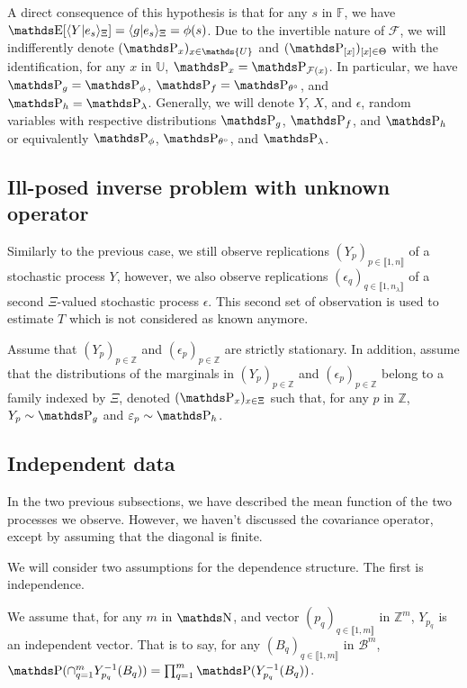 A direct consequence of this hypothesis is that for any $s$ in $\mathds{F}$, we have $\E[ \langle Y \vert e_{s} \rangle_{\Xi}] = \langle g \vert e_{s}\rangle_{\Xi}  = \phi(s)$.
Due to the invertible nature of $\mathcal{F}$, we will indifferently denote $(\P_{x})_{x \in \mathds{U}}$ and $(\P_{[x]})_{[x] \in \Theta}$ with the identification, for any $x$ in $\mathds{U}$, $\P_{x} = \P_{\mathcal{F}(x)}$.
In particular, we have $\P_{g} = \P_{\phi}$, $\P_{f} = \P_{\theta^{\circ}}$, and $\P_{h} = \P_{\lambda}$.
Generally, we will denote $Y$, $X$, and $\epsilon$, random variables with respective distributions $\P_{g}$, $\P_{f}$, and $\P_{h}$ or equivalently $\P_{\phi}$, $\P_{\theta^{\circ}}$, and $\P_{\lambda}$.

\subsection{Ill-posed inverse problem with unknown operator}\label{INTRO_DATA_UNKNOWN}
Similarly to the previous case, we still observe replications $(Y_{p})_{p \in \llbracket 1, n \rrbracket}$ of a stochastic process $Y$, however, we also observe replications $(\epsilon_{q})_{q \in \llbracket 1, n_{\lambda} \rrbracket}$ of a second $\Xi$-valued stochastic process $\epsilon$.
This second set of observation is used to estimate $T$ which is not considered as known anymore.
\begin{as}\label{AS_INTRO_DATA_UNKNOWN}
Assume that $(Y_{p})_{p \in \mathds{Z}}$ and $(\epsilon_{p})_{p \in \mathds{Z}}$ are strictly stationary.
In addition, assume that the distributions of the marginals in $(Y_{p})_{p \in \mathds{Z}}$ and $(\epsilon_{p})_{p \in \mathds{Z}}$ belong to a family indexed by $\Xi$, denoted $(\P_{x})_{x \in \Xi}$ such that, for any $p$ in $\mathds{Z}$, $Y_{p} \sim \P_{g}$ and $\epsilon_{p} \sim \P_{h}$.
\assEnd
\end{as}

\subsection{Independent data}\label{INTRO_DATA_INDEPENDENT}
In the two previous subsections, we have described the mean function of the two processes we observe.
However, we haven't discussed the covariance operator, except by assuming that the diagonal is finite.

We will consider two assumptions for the dependence structure.
The first is independence.

\begin{as}\label{AS_INTRO_DATA_INDEPENDENT}
We assume that, for any $m$ in $\N$, and vector $(p_{q})_{q \in \llbracket 1, m \rrbracket}$ in $\mathds{Z}^{m}$, $Y_{p_{q}}$ is an independent vector.
That is to say, for any $(B_{q})_{q \in \llbracket 1, m \rrbracket}$ in $\mathcal{B}^{m}$, $\P(\cap_{q = 1}^{m} Y_{p_{q}}^{-1}(B_{q})) = \prod_{q = 1}^{m} \P(Y_{p_{q}}^{-1}(B_{q}))$.
\assEnd
\end{as}

